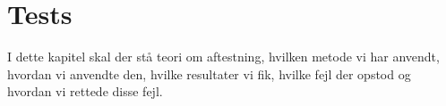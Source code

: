 \chapter{Tests}
I dette kapitel skal der stå teori om aftestning, hvilken metode vi har anvendt, hvordan vi anvendte den, hvilke resultater vi fik, hvilke fejl der opstod og hvordan vi rettede disse fejl.